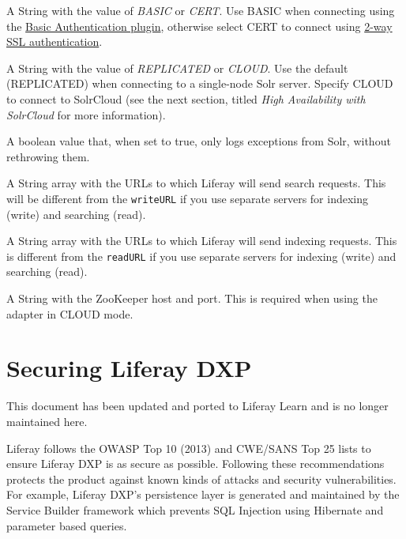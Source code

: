 \begin{description}
\tightlist
\item[\texttt{authenticationMode=BASIC}]
A String with the value of \emph{BASIC} or \emph{CERT}. Use BASIC when
connecting using the
\href{https://cwiki.apache.org/confluence/display/solr/Basic+Authentication+Plugin}{Basic
Authentication plugin}, otherwise select CERT to connect using
\href{https://cwiki.apache.org/confluence/display/solr/Enabling+SSL}{2-way
SSL authentication}.
\item[\texttt{clientType=REPLICATED}]
A String with the value of \emph{REPLICATED} or \emph{CLOUD}. Use the
default (REPLICATED) when connecting to a single-node Solr server.
Specify CLOUD to connect to SolrCloud (see the next section, titled
\emph{High Availability with SolrCloud} for more information).
\item[\texttt{logExceptionsOnly=true}]
A boolean value that, when set to true, only logs exceptions from Solr,
without rethrowing them.
\item[\texttt{readURL=http://localhost:8983/solr/liferay}]
A String array with the URLs to which Liferay will send search requests.
This will be different from the \texttt{writeURL} if you use separate
servers for indexing (write) and searching (read).
\item[\texttt{writeURL=http://localhost:8983/solr/liferay}]
A String array with the URLs to which Liferay will send indexing
requests. This is different from the \texttt{readURL} if you use
separate servers for indexing (write) and searching (read).
\item[\texttt{zkHost=localhost:9983}]
A String with the ZooKeeper host and port. This is required when using
the adapter in CLOUD mode.
\end{description}

\chapter{Securing Liferay DXP}\label{securing-liferay-dxp}

{This document has been updated and ported to Liferay Learn and is no
longer maintained here.}

Liferay follows the OWASP Top 10 (2013) and CWE/SANS Top 25 lists to
ensure Liferay DXP is as secure as possible. Following these
recommendations protects the product against known kinds of attacks and
security vulnerabilities. For example, Liferay DXP's persistence layer
is generated and maintained by the Service Builder framework which
prevents SQL Injection using Hibernate and parameter based queries.

